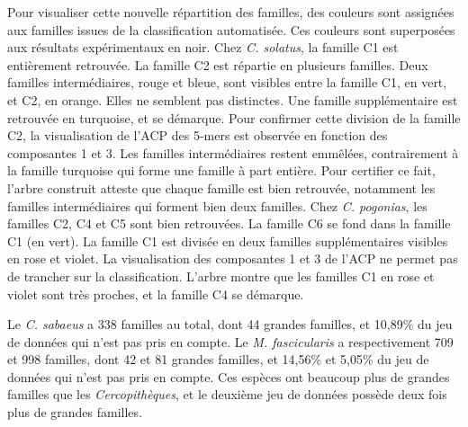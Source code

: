 \documentclass[12pt,a4paper]{article}
\begin{document}
			Pour visualiser cette nouvelle répartition des familles, des couleurs sont assignées aux familles issues de la classification automatisée. Ces couleurs sont superposées aux résultats expérimentaux en noir.  Chez \textit{C. solatus}, la famille C1 est entièrement retrouvée. La famille C2 est répartie en plusieurs familles. Deux familles intermédiaires, rouge et bleue, sont visibles entre la famille C1, en vert, et C2, en orange. Elles ne semblent pas distinctes.  Une famille supplémentaire est retrouvée en turquoise, et se démarque. Pour confirmer cette division de la famille C2, la visualisation de l'ACP des 5-mers est observée en fonction des composantes 1 et 3. Les familles intermédiaires restent emmêlées, contrairement à la famille turquoise qui forme une famille à part entière. Pour certifier ce fait, l'arbre construit atteste que chaque famille est bien retrouvée, notamment les familles intermédiaires qui forment bien deux familles. Chez \textit{C. pogonias}, les familles C2, C4 et C5 sont bien retrouvées. La famille C6 se fond dans la famille C1 (en vert). La famille C1 est divisée en deux familles supplémentaires visibles en rose et violet. La visualisation des composantes 1 et 3 de l'ACP ne permet pas de trancher sur la classification. L'arbre montre que les familles C1 en rose et violet sont très proches, et la famille C4 se démarque.  
			 

			 Le \textit{C. sabaeus} a 338 familles au total, dont 44 grandes familles, et 10,89\% du jeu de données qui n'est pas pris en compte. Le \textit{M. fascicularis} a respectivement 709 et 998 familles, dont 42 et 81 grandes familles, et 14,56\% et 5,05\% du jeu de données qui n'est pas pris en compte. Ces espèces ont beaucoup plus de grandes familles que les \textit{Cercopithèques}, et le deuxième jeu de données possède deux fois plus de grandes familles.
			 
\end{document}
